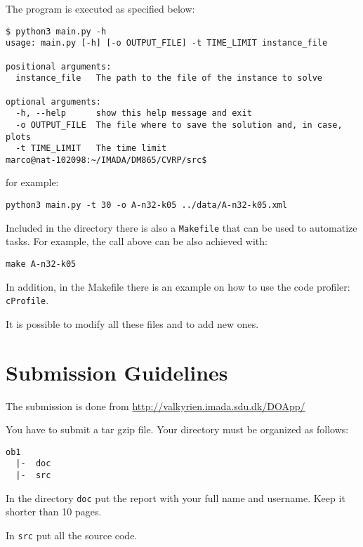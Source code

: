 The program is executed as specified below:

\begin{lstlisting}
$ python3 main.py -h
usage: main.py [-h] [-o OUTPUT_FILE] -t TIME_LIMIT instance_file

positional arguments:
  instance_file   The path to the file of the instance to solve

optional arguments:
  -h, --help      show this help message and exit
  -o OUTPUT_FILE  The file where to save the solution and, in case, plots
  -t TIME_LIMIT   The time limit
marco@nat-102098:~/IMADA/DM865/CVRP/src$ 
\end{lstlisting}

for example: 
\begin{lstlisting}
python3 main.py -t 30 -o A-n32-k05 ../data/A-n32-k05.xml
\end{lstlisting}

Included in the directory there is also a \verb!Makefile! that can be
used to automatize tasks. For example, the call above can be also
achieved with:

\begin{lstlisting}
make A-n32-k05
\end{lstlisting}

In addition, in the Makefile there is an example on how to use the code
profiler: \verb!cProfile!.

It is possible to modify all these files and to add new ones.


\section*{Submission Guidelines}

The submission is done from \url{http://valkyrien.imada.sdu.dk/DOApp/}

You have to submit a tar gzip file.
Your directory must be organized as follows:
\begin{verbatim}
ob1
  |-  doc
  |-  src
\end{verbatim}
In the directory \verb=doc= put the report with your full name and
username. Keep it shorter than 10 pages.

In \verb=src= put all the source code. 
%
%
%

